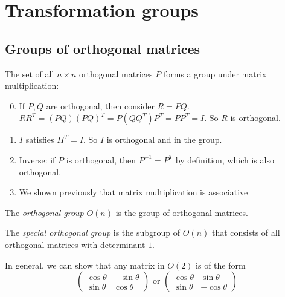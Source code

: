 \documentclass[a4paper]{article}
\begin{document}
\section{Transformation groups}
\subsection{Groups of orthogonal matrices}
\begin{prop}
  The set of all $n\times n$ orthogonal matrices $P$ forms a group under matrix multiplication:
  \begin{enumerate}[label=\arabic{*}.]
    \setcounter{enumi}{-1}
  \item If $P, Q$ are orthogonal, then consider $R = PQ$. $RR^T = (PQ)(PQ)^T = P(QQ^T)P^T = PP^T = I$. So $R$ is orthogonal.
  \item $I$ satisfies $II^T = I$. So $I$ is orthogonal and in the group.
  \item Inverse: if $P$ is orthogonal, then $P^{-1}=P^T$ by definition, which is also orthogonal.
  \item We shown previously that matrix multiplication is associative
  \end{enumerate}
\end{prop}

\begin{defi}
  The \emph{orthogonal group} $O(n)$ is the group of orthogonal matrices.
\end{defi}

\begin{defi}
  The \emph{special orthogonal group} is the subgroup of $O(n)$ that consists of all orthogonal matrices with determinant $1$.
\end{defi}

In general, we can show that any matrix in $O(2)$ is of the form
\[
\begin{pmatrix}
  \cos\theta & -\sin\theta\\
  \sin\theta & \cos\theta
\end{pmatrix}\text{ or }
\begin{pmatrix}
  \cos\theta & \sin\theta\\
  \sin\theta & -\cos\theta
\end{pmatrix}
\]
\end{document}
